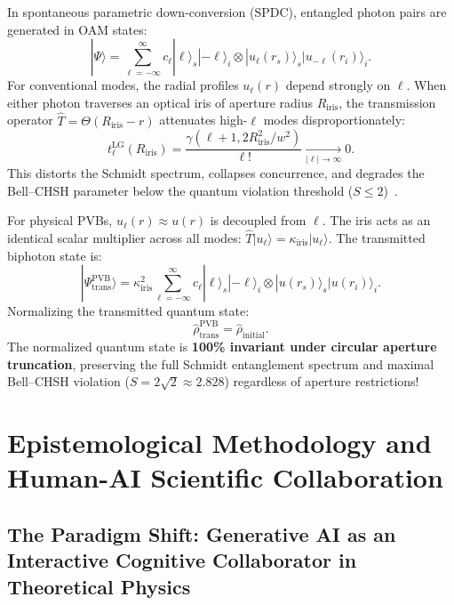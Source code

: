 \documentclass{optica-article}
\begin{document}
In spontaneous parametric down-conversion (SPDC), entangled photon pairs are generated in OAM states:
\begin{equation}
|\Psi\rangle = \sum_{\ell=-\infty}^\infty c_\ell |\ell\rangle_s |-\ell\rangle_i \otimes |u_\ell(r_s)\rangle_s |u_{-\ell}(r_i)\rangle_i.
\label{eq:spdc_biphoton_state}
\end{equation}
For conventional modes, the radial profiles $u_\ell(r)$ depend strongly on $\ell$. When either photon traverses an optical iris of aperture radius $R_{\text{iris}}$, the transmission operator $\hat{T} = \Theta(R_{\text{iris}} - r)$ attenuates high-$\ell$ modes disproportionately:
\begin{equation}
t_\ell^{\text{LG}}(R_{\text{iris}}) = \frac{\gamma(\ell+1, 2 R_{\text{iris}}^2 / w^2)}{\ell!} \xrightarrow[|\ell| \to \infty]{} 0.
\label{eq:lg_pupil_attenuation}
\end{equation}
This distorts the Schmidt spectrum, collapses concurrence, and degrades the Bell--CHSH parameter below the quantum violation threshold ($S \le 2$)~\cite{Clauser1969,LawEberly2004,Walborn2010}.

For physical PVBs, $u_\ell(r) \approx u(r)$ is decoupled from $\ell$. The iris acts as an identical scalar multiplier across all modes: $\hat{T} |u_\ell\rangle = \kappa_{\text{iris}} |u_\ell\rangle$. The transmitted biphoton state is:
\begin{equation}
|\Psi_{\text{trans}}^{\text{PVB}}\rangle = \kappa_{\text{iris}}^2 \sum_{\ell=-\infty}^\infty c_\ell |\ell\rangle_s |-\ell\rangle_i \otimes |u(r_s)\rangle_s |u(r_i)\rangle_i.
\label{eq:pvb_transmitted_biphoton}
\end{equation}
Normalizing the transmitted quantum state:
\begin{equation}
\boxed{\hat{\rho}_{\text{trans}}^{\text{PVB}} = \hat{\rho}_{\text{initial}}.}
\label{eq:rho_invariance}
\end{equation}
The normalized quantum state is \textbf{100\% invariant under circular aperture truncation}, preserving the full Schmidt entanglement spectrum and maximal Bell--CHSH violation ($S = 2\sqrt{2} \approx 2.828$) regardless of aperture restrictions!

\section{Epistemological Methodology and Human-AI Scientific Collaboration}
\label{sec:co_creation}

\subsection{The Paradigm Shift: Generative AI as an Interactive Cognitive Collaborator in Theoretical Physics}
\label{subsec:paradigm_shift}
\end{document}
